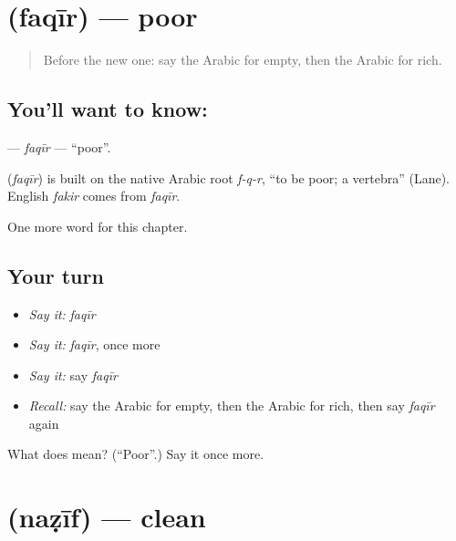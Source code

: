 \section[\texorpdfstring{\ar{فقير} (faqīr)}{فقير (faqīr)}]{ (faqīr) — poor}

\label{lesson:AR-C84-faqir}



\begin{quote}
Before the new one: say the Arabic for empty, then the Arabic for rich.
\end{quote}

\subsection*{You'll want to know: }
\textbf{} — \emph{faqīr} — \textquotedblleft{}poor\textquotedblright{}.

\begin{cousinweb}
\textbf{} (\emph{faqīr}) is built on the native Arabic root \emph{f-q-r}, \textquotedblleft{}to be poor; a vertebra\textquotedblright{} (Lane). English \emph{fakir} comes from \emph{faqīr}.
\end{cousinweb}

\begin{grammarlens}[title={What you've built}]
One more word for this chapter.
\end{grammarlens}

\subsection*{Your turn}
\begin{itemize}
\raggedright
  \item \emph{Say it:} \emph{faqīr}
  \item \emph{Say it:} \emph{faqīr}, once more
  \item \emph{Say it:} say \emph{faqīr}
  \item \emph{Recall:} say the Arabic for empty, then the Arabic for rich, then say \emph{faqīr} again
\end{itemize}

\begin{tcolorbox}[breakable,colback=teal!4,colframe=teal!35!black,title={Before you move on}]
What does  mean? (\textquotedblleft{}Poor\textquotedblright{}.) Say it once more.
\end{tcolorbox}
\section[\texorpdfstring{\ar{نظيف} (naẓīf)}{نظيف (naẓīf)}]{ (naẓīf) — clean}

